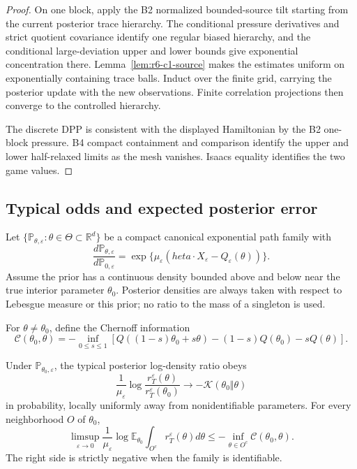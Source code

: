 \begin{proof}
On one block, apply the B2 normalized bounded-source tilt starting from the
current posterior trace hierarchy.  The conditional pressure derivatives and
strict quotient covariance identify one regular biased hierarchy, and the
conditional large-deviation upper and lower bounds give exponential
concentration there.  Lemma~\ref{lem:r6-c1-source} makes the estimates uniform
on exponentially containing trace balls.  Induct over the finite grid,
carrying the posterior update with the new observations.  Finite correlation
projections then converge to the controlled hierarchy.

The discrete DPP is consistent with the displayed Hamiltonian by the B2
one-block pressure.  B4 compact containment and comparison identify the upper
and lower half-relaxed limits as the mesh vanishes.  Isaacs equality identifies
the two game values.
\end{proof}

\subsection{Typical odds and expected posterior error}

Let \(\{\mathbb P_{\theta,\varepsilon}:\theta\in\Theta\subset\mathbb R^d\}\)
be a compact canonical exponential path family with
\[
\frac{d\mathbb P_{\theta,\varepsilon}}
{d\mathbb P_{0,\varepsilon}}
=\exp\{\mu_\varepsilon(	heta\cdot X_\varepsilon-Q_\varepsilon(\theta))\}.
\]
Assume the prior has a continuous density bounded above and below near the
true interior parameter \(\theta_0\).  Posterior densities are always taken
with respect to Lebesgue measure or this prior; no ratio to the mass of a
singleton is used.

For \(\theta\ne\theta_0\), define the Chernoff information
\[
\mathcal C(\theta_0,\theta)=
-\inf_{0\le s\le1}
\left[
Q((1-s)\theta_0+s\theta)
-(1-s)Q(\theta_0)-sQ(\theta)
\right].
\]

\begin{theorem}
\label{thm:r6-c1-testing}
Under \(\mathbb P_{\theta_0,\varepsilon}\), the typical posterior log-density
ratio obeys
\[
\frac1{\mu_\varepsilon}\log
\frac{r_T^\varepsilon(\theta)}{r_T^\varepsilon(\theta_0)}
\longrightarrow
-\mathcal K(\theta_0\Vert\theta)
\]
in probability, locally uniformly away from nonidentifiable parameters.  For
every neighborhood \(O\) of \(\theta_0\),
\[
\limsup_{\varepsilon\to0}
\frac1{\mu_\varepsilon}\log
\mathbb E_{\theta_0}
\int_{O^c}r_T^\varepsilon(\theta)d\theta
\le-\inf_{\theta\in O^c}\mathcal C(\theta_0,\theta).
\]
The right side is strictly negative when the family is identifiable.
\end{theorem}


